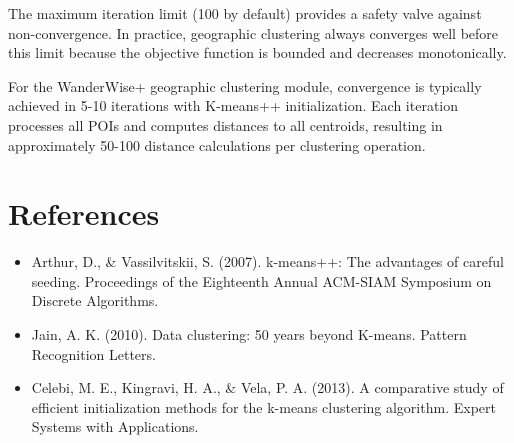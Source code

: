 The maximum iteration limit (100 by default) provides a safety valve against non-convergence. In practice, geographic clustering always converges well before this limit because the objective function is bounded and decreases monotonically.

For the WanderWise+ geographic clustering module, convergence is typically achieved in 5-10 iterations with K-means++ initialization. Each iteration processes all POIs and computes distances to all centroids, resulting in approximately 50-100 distance calculations per clustering operation.

\section*{References}

\begin{itemize}
\item Arthur, D., \& Vassilvitskii, S. (2007). k-means++: The advantages of careful seeding. Proceedings of the Eighteenth Annual ACM-SIAM Symposium on Discrete Algorithms.
\item Jain, A. K. (2010). Data clustering: 50 years beyond K-means. Pattern Recognition Letters.
\item Celebi, M. E., Kingravi, H. A., \& Vela, P. A. (2013). A comparative study of efficient initialization methods for the k-means clustering algorithm. Expert Systems with Applications.
\end{itemize}

